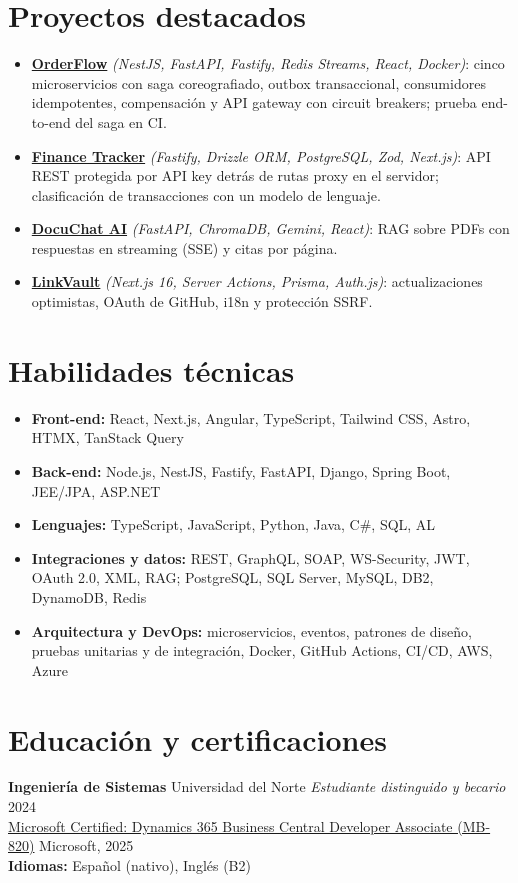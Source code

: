 \documentclass[10pt]{article}
\begin{document}
\section*{Proyectos destacados}
\begin{itemize}
  \item \textbf{\href{https://github.com/MigueIAngel/orderflow}{OrderFlow}} \textit{(NestJS, FastAPI, Fastify, Redis Streams, React, Docker)}: cinco microservicios con saga coreografiado, outbox transaccional, consumidores idempotentes, compensación y API gateway con circuit breakers; prueba end-to-end del saga en CI.
  \item \textbf{\href{https://github.com/MigueIAngel/finance-tracker}{Finance Tracker}} \textit{(Fastify, Drizzle ORM, PostgreSQL, Zod, Next.js)}: API REST protegida por API key detrás de rutas proxy en el servidor; clasificación de transacciones con un modelo de lenguaje.
  \item \textbf{\href{https://github.com/MigueIAngel/docuchat-ai}{DocuChat AI}} \textit{(FastAPI, ChromaDB, Gemini, React)}: RAG sobre PDFs con respuestas en streaming (SSE) y citas por página.
  \item \textbf{\href{https://github.com/MigueIAngel/linkvault}{LinkVault}} \textit{(Next.js 16, Server Actions, Prisma, Auth.js)}: actualizaciones optimistas, OAuth de GitHub, i18n y protección SSRF.
\end{itemize}

\section*{Habilidades técnicas}
\begin{itemize}
  \item \textbf{Front-end:} React, Next.js, Angular, TypeScript, Tailwind CSS, Astro, HTMX, TanStack Query
  \item \textbf{Back-end:} Node.js, NestJS, Fastify, FastAPI, Django, Spring Boot, JEE/JPA, ASP.NET
  \item \textbf{Lenguajes:} TypeScript, JavaScript, Python, Java, C\#, SQL, AL
  \item \textbf{Integraciones y datos:} REST, GraphQL, SOAP, WS-Security, JWT, OAuth 2.0, XML, RAG; PostgreSQL, SQL Server, MySQL, DB2, DynamoDB, Redis
  \item \textbf{Arquitectura y DevOps:} microservicios, eventos, patrones de diseño, pruebas unitarias y de integración, Docker, GitHub Actions, CI/CD, AWS, Azure
\end{itemize}

\section*{Educación y certificaciones}
\noindent\textbf{Ingeniería de Sistemas} \textbar{} Universidad del Norte \textemdash{} \textit{Estudiante distinguido y becario} \hfill 2024\\
\href{https://learn.microsoft.com/api/credentials/share/es-es/MiguelAltamar-5421/468B2D2A0F8511E3?sharingId=88DCDE63C9CD6D93}{Microsoft Certified: Dynamics 365 Business Central Developer Associate (MB-820)} \textemdash{} Microsoft, 2025\\
\textbf{Idiomas:} Español (nativo), Inglés (B2)
\end{document}
